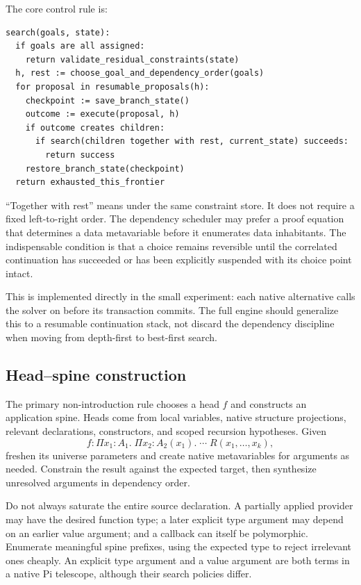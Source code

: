 The core control rule is:
\begin{lstlisting}[language={},caption={Proposed continuation-based search. Each alternative owns its complete dependent continuation.}]
search(goals, state):
  if goals are all assigned:
    return validate_residual_constraints(state)
  h, rest := choose_goal_and_dependency_order(goals)
  for proposal in resumable_proposals(h):
    checkpoint := save_branch_state()
    outcome := execute(proposal, h)
    if outcome creates children:
      if search(children together with rest, current_state) succeeds:
        return success
    restore_branch_state(checkpoint)
  return exhausted_this_frontier
\end{lstlisting}
``Together with rest'' means under the same constraint store. It does not require a fixed left-to-right order. The dependency scheduler may prefer a proof equation that determines a data metavariable before it enumerates data inhabitants. The indispensable condition is that a choice remains reversible until the correlated continuation has succeeded or has been explicitly suspended with its choice point intact.

This is implemented directly in the small experiment: each native  alternative calls the solver on  before its transaction commits. The full engine should generalize this to a resumable continuation stack, not discard the dependency discipline when moving from depth-first to best-first search.

\subsection{Head--spine construction}
The primary non-introduction rule chooses a head $f$ and constructs an application spine. Heads come from local variables, native structure projections, relevant declarations, constructors, and scoped recursion hypotheses. Given
\[
 f:\Pi x_1:A_1.\;\Pi x_2:A_2(x_1).\;\cdots\;R(x_1,\ldots,x_k),
\]
freshen its universe parameters and create native metavariables for arguments as needed. Constrain the result against the expected target, then synthesize unresolved arguments in dependency order.

Do not always saturate the entire source declaration. A partially applied provider may have the desired function type; a later explicit type argument may depend on an earlier value argument; and a callback can itself be polymorphic. Enumerate meaningful spine prefixes, using the expected type to reject irrelevant ones cheaply. An explicit type argument and a value argument are both terms in a native Pi telescope, although their search policies differ.

